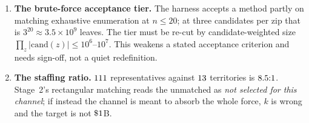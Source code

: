 \documentclass[11pt]{article}
\theoremstyle{definition}
\begin{document}
\begin{enumerate}
\item \textbf{The brute-force acceptance tier.} The harness accepts a method partly on
matching exhaustive enumeration at $n\le20$; at three candidates per zip that is
$3^{20}\approx3.5\times10^9$ leaves. The tier must be re-cut by candidate-weighted size
$\prod_z|\mathrm{cand}(z)|\le10^6$--$10^7$. This weakens a stated acceptance criterion and
needs sign-off, not a quiet redefinition.
\item \textbf{The staffing ratio.} $111$ representatives against $13$
territories is $8.5{:}1$. Stage~2's rectangular matching reads the unmatched as
\emph{not selected for this channel}; if instead the channel is meant to absorb the whole
force, $k$ is wrong and the target is not $\$1$B.
\end{enumerate}



\end{document}
